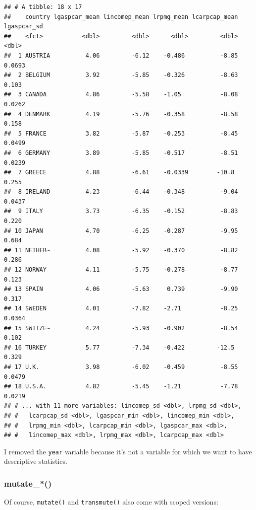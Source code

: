 \documentclass[]{gitbook}
\newenvironment{Shaded}{\begin{snugshade}}{\end{snugshade}}
\newcommand{\KeywordTok}[1]{\textcolor[rgb]{0.13,0.29,0.53}{\textbf{#1}}}
\newcommand{\NormalTok}[1]{#1}
\newcommand{\OperatorTok}[1]{\textcolor[rgb]{0.81,0.36,0.00}{\textbf{#1}}}
\newcommand{\StringTok}[1]{\textcolor[rgb]{0.31,0.60,0.02}{#1}}
\theoremstyle{definition}
\theoremstyle{definition}
\theoremstyle{definition}
\theoremstyle{remark}
\begin{document}
\begin{verbatim}
## # A tibble: 18 x 17
##    country lgaspcar_mean lincomep_mean lrpmg_mean lcarpcap_mean lgaspcar_sd
##    <fct>           <dbl>         <dbl>      <dbl>         <dbl>       <dbl>
##  1 AUSTRIA          4.06         -6.12    -0.486          -8.85      0.0693
##  2 BELGIUM          3.92         -5.85    -0.326          -8.63      0.103 
##  3 CANADA           4.86         -5.58    -1.05           -8.08      0.0262
##  4 DENMARK          4.19         -5.76    -0.358          -8.58      0.158 
##  5 FRANCE           3.82         -5.87    -0.253          -8.45      0.0499
##  6 GERMANY          3.89         -5.85    -0.517          -8.51      0.0239
##  7 GREECE           4.88         -6.61    -0.0339        -10.8       0.255 
##  8 IRELAND          4.23         -6.44    -0.348          -9.04      0.0437
##  9 ITALY            3.73         -6.35    -0.152          -8.83      0.220 
## 10 JAPAN            4.70         -6.25    -0.287          -9.95      0.684 
## 11 NETHER~          4.08         -5.92    -0.370          -8.82      0.286 
## 12 NORWAY           4.11         -5.75    -0.278          -8.77      0.123 
## 13 SPAIN            4.06         -5.63     0.739          -9.90      0.317 
## 14 SWEDEN           4.01         -7.82    -2.71           -8.25      0.0364
## 15 SWITZE~          4.24         -5.93    -0.902          -8.54      0.102 
## 16 TURKEY           5.77         -7.34    -0.422         -12.5       0.329 
## 17 U.K.             3.98         -6.02    -0.459          -8.55      0.0479
## 18 U.S.A.           4.82         -5.45    -1.21           -7.78      0.0219
## # ... with 11 more variables: lincomep_sd <dbl>, lrpmg_sd <dbl>,
## #   lcarpcap_sd <dbl>, lgaspcar_min <dbl>, lincomep_min <dbl>,
## #   lrpmg_min <dbl>, lcarpcap_min <dbl>, lgaspcar_max <dbl>,
## #   lincomep_max <dbl>, lrpmg_max <dbl>, lcarpcap_max <dbl>
\end{verbatim}

I removed the \texttt{year} variable because it's not a variable for
which we want to have descriptive statistics.

\hypertarget{mutate_}{%
\subsubsection{mutate\_*()}\label{mutate_}}

Of course, \texttt{mutate()} and \texttt{transmute()} also come with
scoped versions:

\begin{Shaded}
\end{Shaded}
\end{document}

